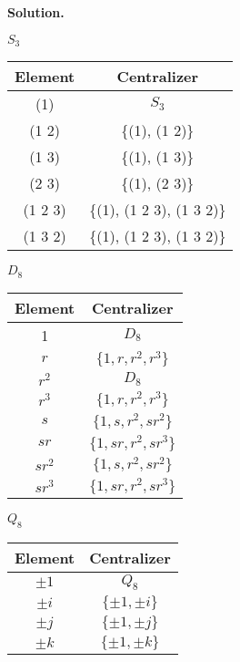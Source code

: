 \begin{enumerate}
      \textbf{Solution.}
      \begin{center}
         $S_3$

         \begin{tabular}{@{}|c|c|@{}} \hline
            Element & Centralizer \\ \hline
            (1) & $S_3$ \\ \hline
            (1 2) & \{(1), (1 2)\} \\ \hline
            (1 3) & \{(1), (1 3)\} \\ \hline
            (2 3) & \{(1), (2 3)\} \\ \hline
            (1 2 3) & \{(1), (1 2 3), (1 3 2)\} \\ \hline
            (1 3 2) & \{(1), (1 2 3), (1 3 2)\} \\ \hline
         \end{tabular}
      \end{center}

      \begin{center}
         $D_8$

         \begin{tabular}{@{}|c|c|@{}} \hline
            Element & Centralizer \\ \hline
            1 & $D_8$ \\ \hline
            $r$ & $\{1, r, r^2, r^3\}$ \\ \hline
            $r^2$ & $D_8$ \\ \hline
            $r^3$ & $\{1, r, r^2, r^3\}$ \\ \hline
            $s$ & $\{1, s, r^2, sr^2\}$ \\ \hline
            $sr$ & $\{1, sr, r^2, sr^3\}$ \\ \hline
            $sr^2$ & $\{1, s, r^2, sr^2\}$ \\ \hline
            $sr^3$ & $\{1, sr, r^2, sr^3\}$ \\ \hline
         \end{tabular}
      \end{center}

      \begin{center}
         $Q_8$

         \begin{tabular}{@{}|c|c|@{}} \hline
            Element & Centralizer \\ \hline
            $\pm1$ & $Q_8$ \\ \hline
            $\pm i$ & $\{\pm1, \pm i\}$ \\ \hline
            $\pm j$ & $\{\pm1, \pm j\}$ \\ \hline
            $\pm k$ & $\{\pm1, \pm k\}$ \\ \hline
         \end{tabular}
      \end{center}


\end{enumerate}
